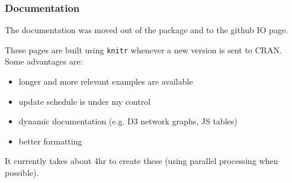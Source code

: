 \documentclass[12 pt]{beamer}\usepackage[]{graphicx}\usepackage[]{color}
\newcommand{\pkg}[1]{{\fontseries{b}\selectfont #1}}
\renewcommand{\pkg}[1]{{\color{darkgreen}\texttt{#1}}}
\begin{document}
  \begin{frame}[fragile]
\frametitle{Documentation}

The documentation was moved out of the package and to the github IO page.

\vspace{.15in}


These pages are built using \pkg{knitr} whenever a new version is sent to CRAN. Some advantages are:

\begin{itemize}
\item longer and more relevant examples are available
\item update schedule is under my control
\item dynamic documentation (e.g. D3 network graphs, JS tables)
\item better formatting
\end{itemize}

\vspace{.1in}

It currently takes about 4hr to create these (using parallel processing when possible).

\end{frame}




\end{document}
